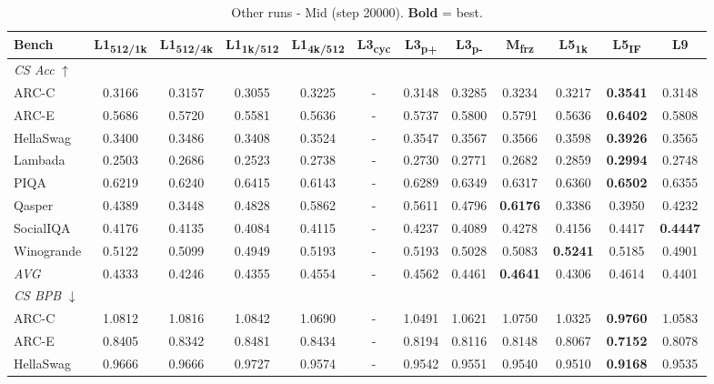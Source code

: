 \begin{table}[htbp]
\centering
\setlength{\tabcolsep}{2.5pt}
\small
\caption{Other runs - Mid (step 20000). \textbf{Bold} = best.}
\label{tab:other_mid}
\begin{tabular}{lccccccccccc}
\toprule
Bench & L1\textsubscript{512/1k} & L1\textsubscript{512/4k} & L1\textsubscript{1k/512} & L1\textsubscript{4k/512} & L3\textsubscript{cyc} & L3\textsubscript{p+} & L3\textsubscript{p-} & M\textsubscript{frz} & L5\textsubscript{1k} & L5\textsubscript{IF} & L9 \\
\midrule
\multicolumn{12}{l}{\textit{CS Acc} $\uparrow$} \\
ARC-C & 0.3166 & 0.3157 & 0.3055 & 0.3225 & - & 0.3148 & 0.3285 & 0.3234 & 0.3217 & \textbf{0.3541} & 0.3148 \\
ARC-E & 0.5686 & 0.5720 & 0.5581 & 0.5636 & - & 0.5737 & 0.5800 & 0.5791 & 0.5636 & \textbf{0.6402} & 0.5808 \\
HellaSwag & 0.3400 & 0.3486 & 0.3408 & 0.3524 & - & 0.3547 & 0.3567 & 0.3566 & 0.3598 & \textbf{0.3926} & 0.3565 \\
Lambada & 0.2503 & 0.2686 & 0.2523 & 0.2738 & - & 0.2730 & 0.2771 & 0.2682 & 0.2859 & \textbf{0.2994} & 0.2748 \\
PIQA & 0.6219 & 0.6240 & 0.6415 & 0.6143 & - & 0.6289 & 0.6349 & 0.6317 & 0.6360 & \textbf{0.6502} & 0.6355 \\
Qasper & 0.4389 & 0.3448 & 0.4828 & 0.5862 & - & 0.5611 & 0.4796 & \textbf{0.6176} & 0.3386 & 0.3950 & 0.4232 \\
SocialIQA & 0.4176 & 0.4135 & 0.4084 & 0.4115 & - & 0.4237 & 0.4089 & 0.4278 & 0.4156 & 0.4417 & \textbf{0.4447} \\
Winogrande & 0.5122 & 0.5099 & 0.4949 & 0.5193 & - & 0.5193 & 0.5028 & 0.5083 & \textbf{0.5241} & 0.5185 & 0.4901 \\
\textit{AVG} & 0.4333 & 0.4246 & 0.4355 & 0.4554 & - & 0.4562 & 0.4461 & \textbf{0.4641} & 0.4306 & 0.4614 & 0.4401 \\
\midrule
\multicolumn{12}{l}{\textit{CS BPB} $\downarrow$} \\
ARC-C & 1.0812 & 1.0816 & 1.0842 & 1.0690 & - & 1.0491 & 1.0621 & 1.0750 & 1.0325 & \textbf{0.9760} & 1.0583 \\
ARC-E & 0.8405 & 0.8342 & 0.8481 & 0.8434 & - & 0.8194 & 0.8116 & 0.8148 & 0.8067 & \textbf{0.7152} & 0.8078 \\
HellaSwag & 0.9666 & 0.9666 & 0.9727 & 0.9574 & - & 0.9542 & 0.9551 & 0.9540 & 0.9510 & \textbf{0.9168} & 0.9535 \\

\end{tabular}
\end{table}
